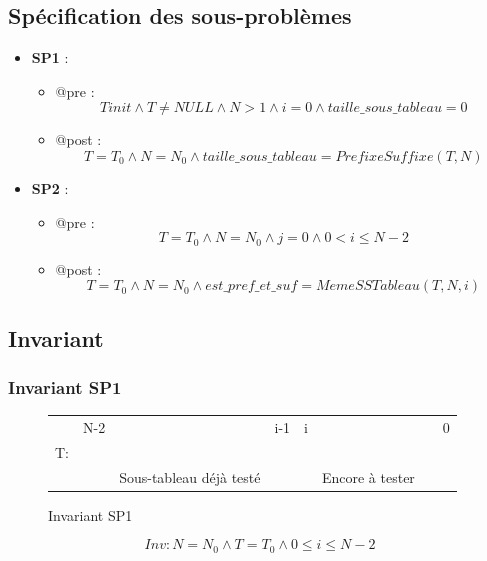 \documentclass[a4paper, 11pt, oneside]{article}
\begin{document}
\subsection{Spécification des sous-problèmes}
\begin{itemize}
  \item \textbf{SP1} : 
  \begin{itemize}
    \item @pre : $$Tinit\wedge T\neq NULL \wedge N>1 \wedge i=0 \wedge taille\_sous\_tableau=0$$
    \item @post : $$T=T_0\wedge N=N_0\wedge taille\_sous\_tableau=PrefixeSuffixe (T, N)$$
  \end{itemize}
  \item \textbf{SP2} :
  \begin{itemize}
  \item @pre : $$T=T_0\wedge N=N_0\wedge j=0 \wedge 0<i\leq N-2 $$
  \item @post : $$T=T_0\wedge N=N_0\wedge est\_pref\_et\_suf=MemeSSTableau(T, N, i)$$
  \end{itemize}
\end{itemize}

\newpage

\subsection{Invariant}
\subsubsection{Invariant SP1}

\begin{figure}[h]
  \centering
  \begin{tabular}{l|lcr|lcr|l}
   & N-2 &  & \multicolumn{1}{r|}{i-1} & i &  & &0 \\ \cline{2-7}
  T: & \cellcolor[HTML]{00ff09} & \cellcolor[HTML]{00ff09} & \cellcolor[HTML]{00ff09} & \cellcolor[HTML]{a3160f} &  \cellcolor[HTML]{a3160f}& \cellcolor[HTML]{a3160f} \\ \cline{2-7}
  &&Sous-tableau déjà testé&&&Encore à tester&& \\ \cline{2-7}
  \end{tabular}
  \caption{Invariant SP1}
\end{figure}

$$Inv: N=N_0 \wedge T=T_0\wedge 0\leq i\leq N-2$$
\end{document}
